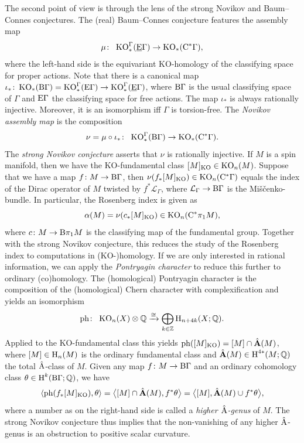 \documentclass[pdftex]{sigma}
\numberwithin{equation}{section}
\newcommand*{\Mishchenko}{Mi\v{s}\v{c}enko}
\begin{document}
The second point of view is through the lens of the strong Novikov and Baum--Connes conjectures.
The (real) Baum--Connes conjecture features the assembly map
\[
 \mu \colon \ \KO_\ast^\Gamma(\Eub \Gamma) \to \KO_\ast(\Cstar \Gamma),
\]
where the left-hand side is the equivariant KO-homology of the classifying space for proper actions.
Note that there is a canonical map \(\iota_\ast \colon \operatorname{KO}_\ast(\mathrm{B} \Gamma) = \operatorname{KO}_\ast^\Gamma(\mathrm{E} \Gamma) \to \operatorname{KO}_\ast^\Gamma(\underline{\mathrm{E}} \Gamma)\), where \(\mathrm{B} \Gamma\) is the usual classifying space of \(\Gamma\) and \(\mathrm{E} \Gamma\) the classifying space for free actions.
The map \(\iota_\ast\) is always rationally injective.
Moreover, it is an isomorphism iff \(\Gamma\) is torsion-free.
The \emph{Novikov assembly map} is the composition
\[
 \nu = \mu \circ \iota_\ast \colon \ \KO_\ast^\Gamma(\Bfree \Gamma) \to \KO_\ast(\Cstar \Gamma).
\]
The \emph{strong Novikov conjecture} asserts that \(\nu\) is rationally injective.
If \(M\) is a spin manifold, then we have the KO-fundamental class \([M]_{\operatorname{KO}} \in \operatorname{KO}_n(M)\).
Suppose that we have a map \(f \colon M \to \mathrm{B} \Gamma\), then \(\nu(f_\ast[M]_{\operatorname{KO}}) \in \operatorname{KO}_n(\mathrm{C}^\ast \Gamma)\) equals the index of the Dirac operator of \(M\) twisted by \(f^\ast \mathcal{L}_\Gamma\), where \(\mathcal{L}_\Gamma \to \mathrm{B} \Gamma\) is the \Mishchenko-bundle.
In particular, the Rosenberg index is given as
\[
 \alpha(M) = \nu(c_\ast [M]_{\operatorname{KO}}) \in \operatorname{KO}_n(\mathrm{C}^\ast \pi_1 M),
\]
where \(c \colon M \to \mathrm{B} \pi_1 M\) is the classifying map of the fundamental group.
Together with the strong Novikov conjecture, this reduces the study of the Rosenberg index to computations in (KO-)homology.
If we are only interested in rational information, we can apply the \emph{Pontryagin character} to reduce this further to ordinary (co)homology.
The (homological) Pontryagin character is the composition of the (homological) Chern character with complexification and yields an isomorphism
\[
 \operatorname{ph} \colon \ \operatorname{KO}_n(X) \otimes \mathbb{Q} \xrightarrow{\cong} \bigoplus_{k \in \mathbb{Z}} \operatorname{H}_{n + 4k}(X; \mathbb{Q}).
\]
Applied to the KO-fundamental class this yields \(\operatorname{ph}([M]_{\operatorname{KO}}) = [M] \cap \hat{\mathbf{A}}(M)\),
where \([M] \in \operatorname{H}_n(M)\) is the ordinary fundamental class and \(\hat{\mathbf{A}}(M) \in \operatorname{H}^{4\ast}(M; \mathbb{Q})\) the total \(\hat{\mathrm{A}}\)-class of \(M\).
Given any map \(f \colon M \to \mathrm{B} \Gamma\) and an ordinary cohomology class \(\theta \in \operatorname{H}^{k}(\mathrm{B} \Gamma; \mathbb{Q})\), we have
\begin{equation} \label{eq:higherAhat}
 \langle \operatorname{ph}(f_\ast [M]_{\operatorname{KO}}), \theta \rangle = \big\langle [M] \cap \hat{\mathbf{A}}(M), f^\ast \theta \big\rangle = \big\langle [M], \hat{\mathbf{A}}(M) \cup f^\ast \theta \big\rangle,
\end{equation}
where a number as on the right-hand side is called a \emph{higher \(\hat{\mathrm{A}}\)-genus} of \(M\).
The strong Novikov conjecture thus implies that the non-vanishing of any higher \(\hat{\mathrm{A}}\)-genus is an obstruction to positive scalar curvature.
\end{document}
